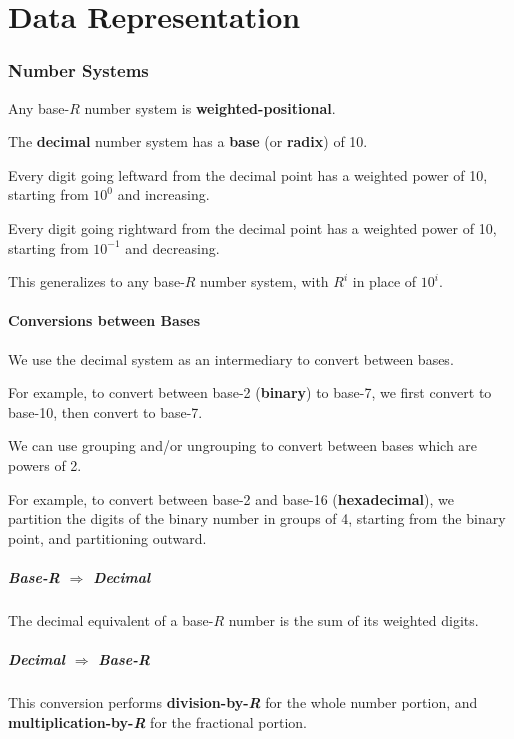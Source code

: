 \part{Data Representation}

\section{Number Systems}
Any base-$R$ number system is \textbf{weighted-positional}.

The \textbf{decimal} number system has a \textbf{base} (or \textbf{radix}) of 10.

Every digit going leftward from the decimal point has a weighted power of 10, starting from $10^0$ and increasing.

Every digit going rightward from the decimal point has a weighted power of 10, starting from $10^{-1}$ and decreasing.

This generalizes to any base-$R$ number system, with $R^i$ in place of $10^i$.

\subsection{Conversions between Bases}
We use the decimal system as an intermediary to convert between bases.

For example, to convert between base-2 (\textbf{binary}) to base-7, we first convert to base-10, then convert to base-7.

We can use grouping and/or ungrouping to convert between bases which are powers of 2.

For example, to convert between base-2 and base-16 (\textbf{hexadecimal}), we partition the digits of the binary
number in groups of 4, starting from the binary point, and partitioning outward.

\subsubsection{Base-\textit{R} $\Rightarrow$ Decimal}
The decimal equivalent of a base-$R$ number is the sum of its weighted digits.

\subsubsection{Decimal $\Rightarrow$ Base-\textit{R}}
This conversion performs \textbf{division-by-\textit{R}} for the whole number portion,
and \textbf{multiplication-by-\textit{R}} for the fractional portion.

